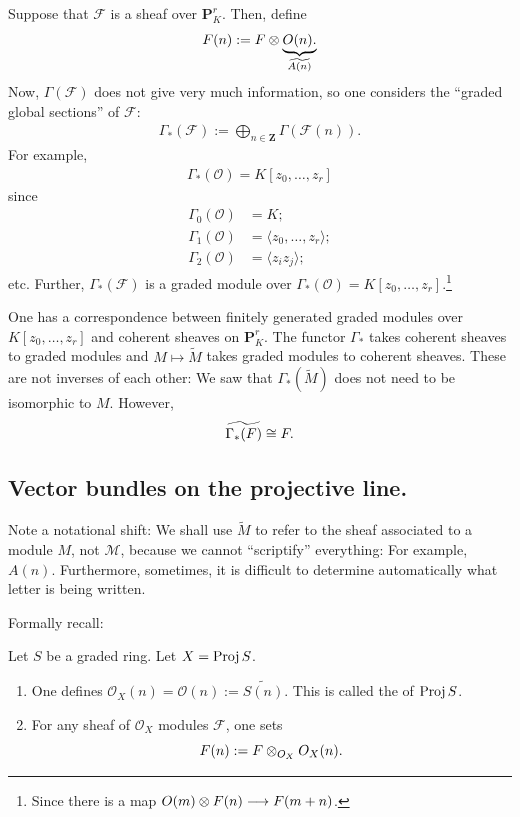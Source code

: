 \documentclass [11 pt, oneside] {article}
\begin{document}
Suppose that $\mathscr{F}$ is a sheaf over $\mathbf{P}^r_K$. Then, define 
\begin{align*}
	\relax{F}(n):=  \relax{F}\otimes \underbrace{\relax{O}(n).}_{\widetilde{A(n)}}
\end{align*}
Now, $\Gamma(\mathscr{F})$ does not give very much information, so one considers the ``graded global sections'' of $\mathscr{F}$:
\begin{align*}
	\Gamma_*(\mathscr{F}) := \bigoplus_{n\in\mathbf{Z}} \Gamma(\mathscr{F}(n)).
\end{align*}
For example,
\begin{align*}
	\Gamma_*(\mathscr{O}) = K[z_0,\hdots, z_r]
\end{align*}
since
\begin{align*}
	\Gamma_0(\mathscr{O}) &= K;\\
	\Gamma_1(\mathscr{O}) &= \langle z_0,\hdots, z_r\rangle;\\
	\Gamma_2(\mathscr{O}) &= \langle z_iz_j\rangle;
\end{align*}
etc.
Further, $\Gamma_*(\mathscr{F})$ is a graded module over $\Gamma_*(\mathscr{O}) = K[z_0,\hdots, z_r]$.\footnote{Since there is a map $\relax{O}(m)\otimes  \relax{F}(n) \longrightarrow \relax{F}(m+n)$.}

One has a correspondence between finitely generated graded modules over $K[z_0,\hdots,z_r]$ and coherent sheaves on $\mathbf{P}^r_K$. The functor $\Gamma_*$ takes coherent sheaves to graded modules and $M\longmapsto \tilde M$ takes graded modules to coherent sheaves. These are not inverses of each other: We saw that $\Gamma_*(\tilde M)$ does not need to be isomorphic to $M$. However, 
\begin{align*}
	\widetilde{\Gamma_*(\relax{F}) } \cong \relax{F}.
\end{align*}

\subsection{Vector bundles on the projective line.}
Note a notational shift: We shall use $\tilde M$ to refer to the sheaf associated to a module $M$, not $\mathscr M$, because we cannot ``scriptify'' everything: For example, $A(n)$. Furthermore, sometimes, it is difficult to determine automatically what letter is being written. 

Formally recall:

\begin{definition}
Let $S$ be a graded ring. Let $X=\operatorname{Proj} S$.
\begin{enumerate}
	\item One defines $\mathscr{O}_X(n)=\mathscr{O}(n) := \widetilde{S(n)}$. This is called the  of $\operatorname{Proj} S$.
	\item For any sheaf of $\mathscr{O}_X$ modules $\mathscr{F}$, one sets
	\[
		\relax{F}(n):= \relax{F} \otimes_{\relax{O}_X} \relax{O}_X(n).
	\]	
\end{enumerate}

\end{definition}
\end{document}
